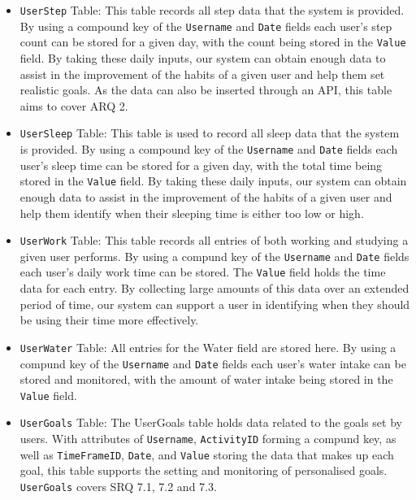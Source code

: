 \documentclass[11pt]{article}
\begin{document}
\begin{itemize}

    \item \texttt{UserStep} Table: This table records all step data
    that the system is provided. By using a compound key
    of the \texttt{Username} and \texttt{Date} fields each user's step count can be stored
    for a given day, with the count being stored in the \texttt{Value} field. By taking these 
    daily inputs, our system can obtain enough data to assist in the improvement of the
    habits of a given user and help them set realistic goals. As the data can also be inserted 
    through an API, this table aims to cover ARQ 2.\par

    \item \texttt{UserSleep} Table: This table is used to record all sleep data 
    that the system is provided. By using a compound key
    of the \texttt{Username} and \texttt{Date} fields each user's sleep time can be stored
    for a given day, with the total time being stored in the \texttt{Value} field. By taking these 
    daily inputs, our system can obtain enough data to assist in the improvement of the
    habits of a given user and help them identify when their sleeping time is either too low or high.\par

    \item \texttt{UserWork} Table: This table records all entries of both working and studying
    a given user performs. By using a compund key of
    the \texttt{Username} and \texttt{Date} fields each user's daily work time can be stored. The \texttt{Value} field holds the time data for each entry.
    By collecting large amounts of this data over an extended period of time, our system can support a user in identifying
    when they should be using their time more effectively.\par

    \item \texttt{UserWater} Table: All entries for the Water field are stored here.
    By using a compund key of the \texttt{Username} and \texttt{Date} fields each user's water 
    intake can be stored and monitored, with the amount of water intake being stored in the \texttt{Value} field.\par

    \newpage

    \item \texttt{UserGoals} Table: The UserGoals table holds data related to the goals set by users.
        With attributes of \texttt{Username}, \texttt{ActivityID} forming a compund key, as well as \texttt{TimeFrameID}, \texttt{Date}, and
        \texttt{Value} storing the data that makes up each goal, this table supports the setting and monitoring of personalised
        goals. \texttt{UserGoals} covers SRQ 7.1, 7.2 and 7.3.\par

\end{itemize}
\end{document}
